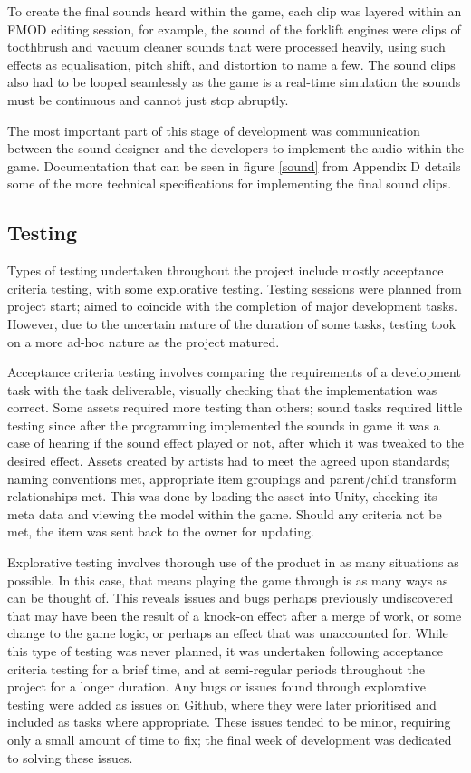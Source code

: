 \documentclass[12pt]{article}
\begin{document}
To create the final sounds heard within the game, each clip was layered within an FMOD editing session, for example, the sound of the forklift engines were clips of toothbrush and vacuum cleaner sounds that were processed heavily, using such effects as equalisation, pitch shift, and distortion to name a few. The sound clips also had to be looped seamlessly as the game is a real-time simulation the sounds must be continuous and cannot just stop abruptly.

The most important part of this stage of development was communication between the sound designer and the developers to implement the audio within the game. Documentation that can be seen in figure \ref{sound} from Appendix D details some of the more technical specifications for implementing the final sound clips.

\subsection{Testing}
Types of testing undertaken throughout the project include mostly acceptance criteria testing, with some explorative testing. Testing sessions were planned from project start; aimed to coincide with the completion of major development tasks. However, due to the uncertain nature of the duration of some tasks, testing took on a more ad-hoc nature as the project matured. 

Acceptance criteria testing involves comparing the requirements of a development task with the task deliverable, visually checking that the implementation was correct. Some assets required more testing than others; sound tasks required little testing since after the programming implemented the sounds in game it was a case of hearing if the sound effect played or not, after which it was tweaked to the desired effect. Assets created by artists had to meet the agreed upon standards; naming conventions met, appropriate item groupings and parent/child transform relationships met. This was done by loading the asset into Unity, checking its meta data and viewing the model within the game. Should any criteria not be met, the item was sent back to the owner for updating. 

Explorative testing involves thorough use of the product in as many situations as possible. In this case, that means playing the game through is as many ways as can be thought of. This reveals issues and bugs perhaps previously undiscovered that may have been the result of a knock-on effect after a merge of work, or some change to the game logic, or perhaps an effect that was unaccounted for. While this type of testing was never planned, it was undertaken following acceptance criteria testing for a brief time, and at semi-regular periods throughout the project for a longer duration. Any bugs or issues found through explorative testing were added as issues on Github, where they were later prioritised and included as tasks where appropriate. These issues tended to be minor, requiring only a small amount of time to fix; the final week of development was dedicated to solving these issues. 
\end{document}
